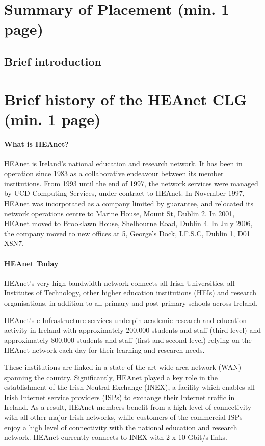 \documentclass{article}
\begin{document}
	\section{Summary of Placement (min. 1 page)}
	\subsection{Brief introduction}
	
	\newpage
	\section{Brief history of the HEAnet CLG (min. 1 page)}
	
	\paragraph{What is HEAnet?}
	HEAnet is Ireland's national education and research network. It has been in operation since 1983 as a collaborative endeavour between its member institutions. From 1993 until the end of 1997, the network services were managed by UCD Computing Services, under contract to HEAnet. In November 1997, HEAnet was incorporated as a company limited by guarantee, and relocated its network operations centre to Marine House, Mount St, Dublin 2. In 2001, HEAnet moved to Brooklawn House, Shelbourne Road, Dublin 4. In July 2006, the company moved to new offices at 5, George's Dock, I.F.S.C, Dublin 1, D01 X8N7.
	
	\paragraph{HEAnet Today}
	
	HEAnet's very high bandwidth network connects all Irish Universities, all Institutes of Technology, other higher education institutions (HEIs) and research organisations, in addition to all primary and post-primary schools across Ireland.
	
	HEAnet's e-Infrastructure services underpin academic research and education activity in Ireland with approximately 200,000 students and staff (third-level) and approximately 800,000 students and staff (first and second-level) relying on the HEAnet network each day for their learning and research needs.
	
	These institutions are linked in a state-of-the art wide area network (WAN) spanning the country. Significantly, HEAnet played a key role in the establishment of the Irish Neutral Exchange (INEX), a facility which enables all Irish Internet service providers (ISPs) to exchange their Internet traffic in Ireland. As a result, HEAnet members benefit from a high level of connectivity with all other major Irish networks, while customers of the commercial ISPs enjoy a high level of connectivity with the national education and research network. HEAnet currently connects to INEX with 2 x 10 Gbit/s links.
	
\end{document}

